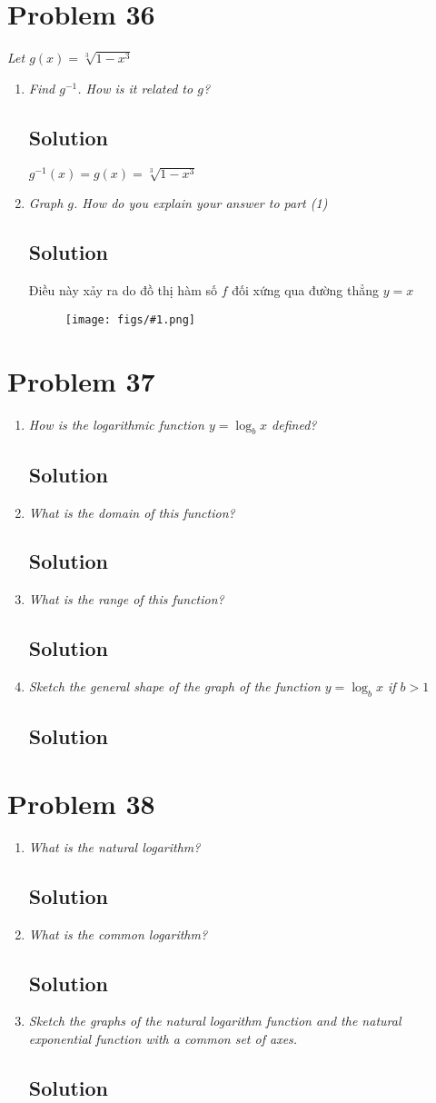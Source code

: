 \documentclass[11pt]{article}
\newcommand{\soln}{\subsection*}
\newcommand{\qn}{\textit}
\newcommand{\imgsoln}[1]{
	\begin{figure}[H]
		\centering
		\texttt{[image: figs/\#1.png]}
	\end{figure}
}
\begin{document}
\section*{Problem 36}

\qn{Let $g(x)=\sqrt[3]{1-x^3}$}

\begin{enumerate}
	\item \qn{Find $g^{-1}$. How is it related to $g$?}
	\soln{Solution}
	$g^{-1}(x)=g(x)=\sqrt[3]{1-x^3}$
	
	\item \qn{Graph $g$. How do you explain your answer to part (1)}
	\soln{Solution}
	Điều này xảy ra do đồ thị hàm số $f$ đối xứng qua đường thẳng $y=x$
	\imgsoln{1.5.36-ans.b}
\end{enumerate}

\section*{Problem 37}

\begin{enumerate}
	\item \qn{How is the logarithmic function $y=\log_b{x}$ defined?}
	\soln{Solution}
	
	\item \qn{What is the domain of this function?}
	\soln{Solution}
	
	\item \qn{What is the range of this function?}
	\soln{Solution}
	
	\item \qn{Sketch the general shape of the graph of the function $y=\log_b{x}$ if $b>1$}
	\soln{Solution}
\end{enumerate}

\section*{Problem 38}

\begin{enumerate}
	\item \qn{What is the natural logarithm?}
	\soln{Solution}
	
	\item \qn{What is the common logarithm?}
	\soln{Solution}
	
	\item \qn{Sketch the graphs of the natural logarithm function and the natural exponential function with a common set of axes.}
	\soln{Solution}
\end{enumerate}
\end{document}
